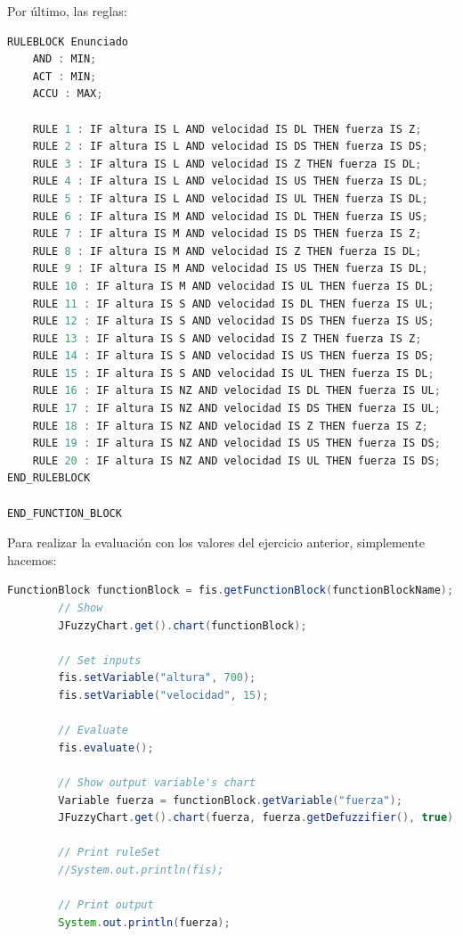 \documentclass[
]{article}
\begin{document}
Por último, las reglas:

\begin{lstlisting}[language=Java, caption=Definición de variables de reglas]
RULEBLOCK Enunciado
    AND : MIN;          
    ACT : MIN;          
    ACCU : MAX;         

    RULE 1 : IF altura IS L AND velocidad IS DL THEN fuerza IS Z;
    RULE 2 : IF altura IS L AND velocidad IS DS THEN fuerza IS DS; 
    RULE 3 : IF altura IS L AND velocidad IS Z THEN fuerza IS DL;
    RULE 4 : IF altura IS L AND velocidad IS US THEN fuerza IS DL;
    RULE 5 : IF altura IS L AND velocidad IS UL THEN fuerza IS DL;
    RULE 6 : IF altura IS M AND velocidad IS DL THEN fuerza IS US; 
    RULE 7 : IF altura IS M AND velocidad IS DS THEN fuerza IS Z; 
    RULE 8 : IF altura IS M AND velocidad IS Z THEN fuerza IS DL;
    RULE 9 : IF altura IS M AND velocidad IS US THEN fuerza IS DL;
    RULE 10 : IF altura IS M AND velocidad IS UL THEN fuerza IS DL;
    RULE 11 : IF altura IS S AND velocidad IS DL THEN fuerza IS UL; 
    RULE 12 : IF altura IS S AND velocidad IS DS THEN fuerza IS US; 
    RULE 13 : IF altura IS S AND velocidad IS Z THEN fuerza IS Z; 
    RULE 14 : IF altura IS S AND velocidad IS US THEN fuerza IS DS; 
    RULE 15 : IF altura IS S AND velocidad IS UL THEN fuerza IS DL; 
    RULE 16 : IF altura IS NZ AND velocidad IS DL THEN fuerza IS UL; 
    RULE 17 : IF altura IS NZ AND velocidad IS DS THEN fuerza IS UL; 
    RULE 18 : IF altura IS NZ AND velocidad IS Z THEN fuerza IS Z; 
    RULE 19 : IF altura IS NZ AND velocidad IS US THEN fuerza IS DS; 
    RULE 20 : IF altura IS NZ AND velocidad IS UL THEN fuerza IS DS; 
END_RULEBLOCK

END_FUNCTION_BLOCK
\end{lstlisting}

Para realizar la evaluación con los valores del ejercicio anterior,
simplemente hacemos:

\begin{lstlisting}[language=Java, caption=Definición de variables de reglas]
  FunctionBlock functionBlock = fis.getFunctionBlock(functionBlockName);
        // Show
        JFuzzyChart.get().chart(functionBlock);

        // Set inputs
        fis.setVariable("altura", 700);
        fis.setVariable("velocidad", 15);
        
        // Evaluate
        fis.evaluate();

        // Show output variable's chart
        Variable fuerza = functionBlock.getVariable("fuerza");
        JFuzzyChart.get().chart(fuerza, fuerza.getDefuzzifier(), true);
        
        // Print ruleSet
        //System.out.println(fis);
        
        // Print output
        System.out.println(fuerza);
\end{lstlisting}
\end{document}
